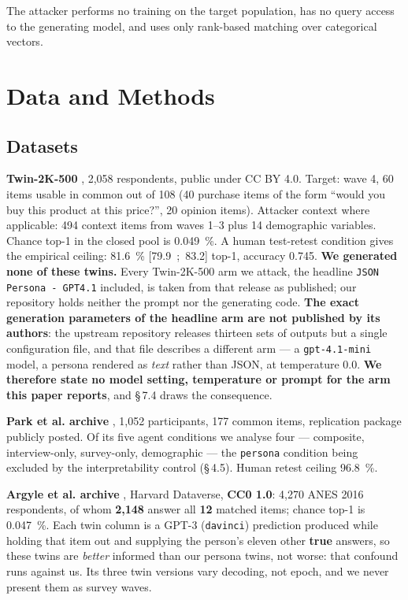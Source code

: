\documentclass[sigconf,anonymous,review]{acmart}
\begin{document}
The attacker performs no training on the target population, has no query access to the generating model, and uses only rank-based matching over categorical vectors.

\section{Data and Methods}

\subsection{Datasets}

\textbf{Twin-2K-500} \cite{toubia2025twin2k500}, 2,058 respondents, public under CC BY 4.0. Target: wave 4, 60 items usable in common out of 108 (40 purchase items of the form ``would you buy this product at this price?'', 20 opinion items). Attacker context where applicable: 494 context items from waves 1--3 plus 14 demographic variables. Chance top-1 in the closed pool is 0.049~\%. A human test-retest condition gives the empirical ceiling: 81.6~\% [79.9~;~83.2] top-1, accuracy 0.745. \textbf{We generated none of these twins.} Every Twin-2K-500 arm we attack, the headline \texttt{JSON Persona -\allowbreak{} GPT4\allowbreak{}.1} included, is taken from that release as published; our repository holds neither the prompt nor the generating code. \textbf{The exact generation parameters of the headline arm are not published by its authors}: the upstream repository releases thirteen sets of outputs but a single configuration file, and that file describes a different arm --- a \texttt{gpt-\allowbreak{}4\allowbreak{}.1-\allowbreak{}mini} model, a persona rendered as \textit{text} rather than JSON, at temperature 0.0. \textbf{We therefore state no model setting, temperature or prompt for the arm this paper reports}, and \S\,7.4 draws the consequence.

\textbf{Park et al. archive} \cite{park2024agents}, 1,052 participants, 177 common items, replication package publicly posted. Of its five agent conditions we analyse four --- composite, interview-only, survey-only, demographic --- the \texttt{persona} condition being excluded by the interpretability control (\S\,4.5). Human retest ceiling 96.8~\%.

\textbf{Argyle et al. archive} \cite{argyle2023outofone}, Harvard Dataverse, \textbf{CC0 1.0}: 4,270 ANES 2016 respondents, of whom \textbf{2,148} answer all \textbf{12} matched items; chance top-1 is 0.047~\%. Each twin column is a GPT-3 (\texttt{davinci}) prediction produced while holding that item out and supplying the person's eleven other \textbf{true} answers, so these twins are \textit{better} informed than our persona twins, not worse: that confound runs against us. Its three twin versions vary decoding, not epoch, and we never present them as survey waves.
\end{document}
